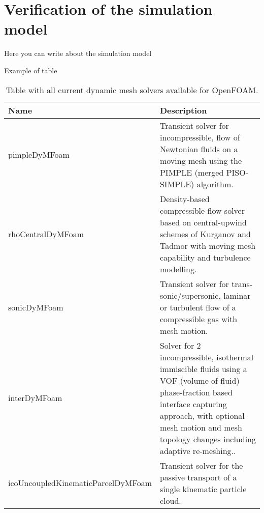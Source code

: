 \section{Verification of the simulation model}

Here you can write about the simulation model

Example of table

		\begin{table}[H]
			\centering
			\begin{tabularx}{\textwidth}{ |X|X| }
				\hline
				\textbf{Name} & \textbf{Description}\\
				\hline
					pimpleDyMFoam 			& Transient solver for incompressible, flow of Newtonian fluids on a moving mesh using the PIMPLE (merged PISO-SIMPLE) algorithm. \\
				\hline
					rhoCentralDyMFoam			& Density-based compressible flow solver based on central-upwind schemes of Kurganov and Tadmor with moving mesh capability and turbulence modelling. \\
				\hline
					sonicDyMFoam			& Transient solver for trans-sonic/supersonic, laminar or turbulent flow of a compressible gas with mesh motion. \\
				\hline
					interDyMFoam			& Solver for 2 incompressible, isothermal immiscible fluids using a VOF (volume of fluid) phase-fraction based interface capturing approach, with optional mesh motion and mesh topology changes including adaptive re-meshing.. \\
				\hline
					icoUncoupledKinematicParcelDyMFoam			& Transient solver for the passive transport of a single kinematic particle cloud. \\
				\hline
			\end{tabularx}
			\caption{Table with all current dynamic mesh solvers available for OpenFOAM.}
			\label{tab:dynamic_mesh_solvers}
		\end{table}